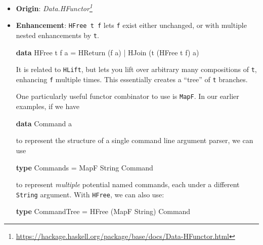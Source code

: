 \documentclass[]{article}
\newenvironment{Shaded}{}{}
\newcommand{\DataTypeTok}[1]{\textcolor[rgb]{0.56,0.13,0.00}{#1}}
\newcommand{\KeywordTok}[1]{\textcolor[rgb]{0.00,0.44,0.13}{\textbf{#1}}}
\newcommand{\NormalTok}[1]{#1}
\newcommand{\OperatorTok}[1]{\textcolor[rgb]{0.40,0.40,0.40}{#1}}
\newcommand{\OtherTok}[1]{\textcolor[rgb]{0.00,0.44,0.13}{#1}}
\renewcommand{\href}[2]{#2\footnote{\url{#1}}}
\begin{document}
\begin{itemize}
\item
  \textbf{Origin}:
  \emph{\href{https://hackage.haskell.org/package/base/docs/Data-HFunctor.html}{Data.HFunctor}}
\item
  \textbf{Enhancement}: \texttt{HFree\ t\ f} lets \texttt{f} exist either
  unchanged, or with multiple nested enhancements by \texttt{t}.

\begin{Shaded}
\begin{Highlighting}[]
\KeywordTok{data} \DataTypeTok{HFree}\NormalTok{ t f a}
    \OtherTok{=} \DataTypeTok{HReturn}\NormalTok{ (f a)}
    \OperatorTok{|} \DataTypeTok{HJoin}\NormalTok{   (t (}\DataTypeTok{HFree}\NormalTok{ t f) a)}
\end{Highlighting}
\end{Shaded}

  It is related to \texttt{HLift}, but lets you lift over arbitrary many
  compositions of \texttt{t}, enhancing \texttt{f} multiple times. This
  essentially creates a ``tree'' of \texttt{t} branches.

  One particularly useful functor combinator to use is \texttt{MapF}. In our
  earlier examples, if we have

\begin{Shaded}
\begin{Highlighting}[]
\KeywordTok{data} \DataTypeTok{Command}\NormalTok{ a}
\end{Highlighting}
\end{Shaded}

  to represent the structure of a single command line argument parser, we can
  use

\begin{Shaded}
\begin{Highlighting}[]
\KeywordTok{type} \DataTypeTok{Commands} \OtherTok{=} \DataTypeTok{MapF} \DataTypeTok{String} \DataTypeTok{Command}
\end{Highlighting}
\end{Shaded}

  to represent \emph{multiple} potential named commands, each under a different
  \texttt{String} argument. With \texttt{HFree}, we can also use:

\begin{Shaded}
\begin{Highlighting}[]
\KeywordTok{type} \DataTypeTok{CommandTree} \OtherTok{=} \DataTypeTok{HFree}\NormalTok{ (}\DataTypeTok{MapF} \DataTypeTok{String}\NormalTok{) }\DataTypeTok{Command}
\end{Highlighting}
\end{Shaded}


\end{itemize}
\end{document}
